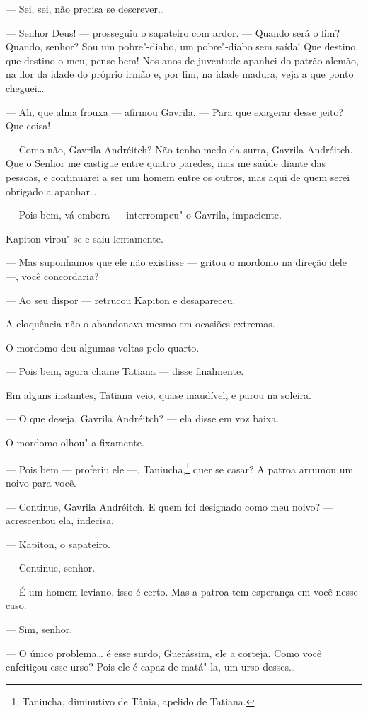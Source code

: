 --- Sei, sei, não precisa se descrever\ldots{}

--- Senhor Deus! --- prosseguiu o sapateiro com ardor. --- Quando será o
fim? Quando, senhor? Sou um pobre"-diabo, um pobre"-diabo sem saída! Que
destino, que destino o meu, pense bem! Nos anos de juventude apanhei do
patrão alemão, na flor da idade do próprio irmão e, por fim, na idade
madura, veja a que ponto cheguei\ldots{}

--- Ah, que alma frouxa --- afirmou Gavrila. --- Para que exagerar desse
jeito? Que coisa!

--- Como não, Gavrila Andréitch? Não tenho medo da surra, Gavrila
Andréitch. Que o Senhor me castigue entre quatro paredes, mas me saúde
diante das pessoas, e continuarei a ser um homem entre os outros, mas
aqui de quem serei obrigado a apanhar\ldots{}

--- Pois bem, vá embora --- interrompeu"-o Gavrila, impaciente.

Kapiton virou"-se e saiu lentamente.

--- Mas suponhamos que ele não existisse --- gritou o mordomo na direção
dele ---, você concordaria?

--- Ao seu dispor --- retrucou Kapiton e desapareceu.

A eloquência não o abandonava mesmo em ocasiões extremas.

O mordomo deu algumas voltas pelo quarto.

--- Pois bem, agora chame Tatiana --- disse finalmente.

Em alguns instantes, Tatiana veio, quase inaudível, e parou na soleira.

--- O que deseja, Gavrila Andréitch? --- ela disse em voz baixa.

O mordomo olhou"-a fixamente.

--- Pois bem --- proferiu ele ---, Taniucha,\footnote{Taniucha,
  diminutivo de Tânia, apelido de Tatiana.} quer se casar? A patroa arrumou um noivo para
você.

--- Continue, Gavrila Andréitch. E quem foi designado como meu noivo?
--- acrescentou ela, indecisa.

--- Kapiton, o sapateiro.

--- Continue, senhor.

--- É um homem leviano, isso é certo. Mas a patroa tem esperança em você
nesse caso.

--- Sim, senhor.

--- O único problema\ldots{} é esse surdo, Guerássim, ele a corteja. Como
você enfeitiçou esse urso? Pois ele é capaz de matá"-la, um urso
desses\ldots{}

